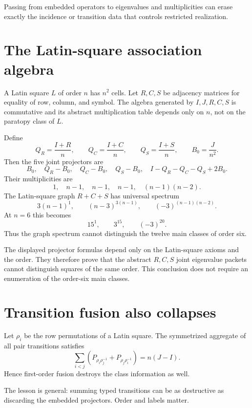 \begin{principle}
Passing from embedded operators to eigenvalues and multiplicities can erase exactly the incidence or transition data that controls restricted realization.
\end{principle}

\section{The Latin-square association algebra}
A Latin square $L$ of order $n$ has $n^2$ cells.  Let $R,C,S$ be adjacency matrices for equality of row, column, and symbol.  The algebra generated by $I,J,R,C,S$ is commutative and its abstract multiplication table depends only on $n$, not on the paratopy class of $L$.

Define
\[
Q_R=\frac{I+R}{n},
\qquad
Q_C=\frac{I+C}{n},
\qquad
Q_S=\frac{I+S}{n},
\qquad
B_0=\frac{J}{n^2}.
\]
Then the five joint projectors are
\[
B_0,
\quad Q_R-B_0,
\quad Q_C-B_0,
\quad Q_S-B_0,
\quad I-Q_R-Q_C-Q_S+2B_0.
\]
Their multiplicities are
\[
1,
\quad n-1,
\quad n-1,
\quad n-1,
\quad (n-1)(n-2).
\]
The Latin-square graph $R+C+S$ has universal spectrum
\[
3(n-1)^1,
\qquad
(n-3)^{3(n-1)},
\qquad
(-3)^{(n-1)(n-2)}.
\]
At $n=6$ this becomes
\[
15^1,\qquad3^{15},\qquad(-3)^{20}.
\]
Thus the graph spectrum cannot distinguish the twelve main classes of order six.

\begin{provedbox}
The displayed projector formulas depend only on the Latin-square axioms and the order.  They therefore prove that the abstract $R,C,S$ joint eigenvalue packets cannot distinguish squares of the same order.  This conclusion does not require an enumeration of the order-six main classes.
\end{provedbox}

\section{Transition fusion also collapses}
Let $\rho_i$ be the row permutations of a Latin square.  The symmetrized aggregate of all pair transitions satisfies
\begin{equation}\label{eq:transition-fusion}
\sum_{i<j}
\left(
P_{\rho_i\rho_j^{-1}}
+
P_{\rho_j\rho_i^{-1}}
\right)
=n(J-I).
\end{equation}
Hence first-order fusion destroys the class information as well.

The lesson is general: summing typed transitions can be as destructive as discarding the embedded projectors.  Order and labels matter.

